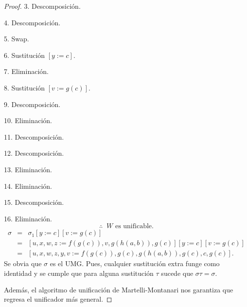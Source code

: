 \documentclass{article}
\begin{document}
\begin{proof}
  3. Descomposición. 
  
  4. Descomposición.
  
  5. Swap.
  
  6. Sustitución $[y := c]$.
  
  7. Eliminación.
  
  8. Sustitución $[v := g(c)]$.
  
  9. Descomposición.
  
  10. Eliminación.
  
  11. Descomposición.
  
  12. Descomposición.
  
  13. Eliminación.
  
  14. Eliminación.
  
  15. Descomposición.
  
  16. Eliminación.
  \[\therefore\;\; W \text{ es unificable.}\]
  \begin{eqnarray*}
    \sigma &=& \sigma_{1}[y := c][v := g(c)]\\
    &=& [u, x, w, z := f(g(c)), v, g(h(a, b)), g(c)][y := c][v := g(c)]\\
    &=& [u, x, w, z, y, v := f(g(c)), g(c), g(h(a, b)), g(c), c, g(c)].
  \end{eqnarray*}
  Se obvia que $\sigma$ es el UMG. Pues, cualquier sustitución extra funge como
  identidad y se cumple que para alguna sustitución $\tau$ sucede que $\sigma\tau = \sigma$.
  
  Además, el algoritmo de unificación de Martelli-Montanari nos garantiza que regresa el unificador
  más general.
\end{proof}
\end{document}
